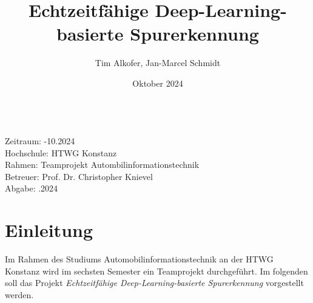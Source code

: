 \documentclass{article}
\title{Echtzeitfähige Deep-Learning-basierte Spurerkennung}
\author{Tim Alkofer, Jan-Marcel Schmidt}
\date{Oktober 2024} %
\begin{document}
    
    \maketitle
    
    \begin{tabbing}
    \hspace{5em} \= \\
        Zeitraum: -10.2024 \\ %
        Hochschule: \> HTWG Konstanz \\
        Rahmen: \> Teamprojekt Autombilinformationstechnik \\
        Betreuer: \> Prof. Dr. Christopher Knievel \\
        Abgabe: .2024 \\ %
    \end{tabbing}

    \clearpage
    \tableofcontents
    \clearpage
    \listoffigures
    \clearpage
    
    
    \clearpage

    \section{Einleitung}
        Im Rahmen des Studiums Automobilinformationstechnik an der HTWG Konstanz wird im sechsten Semester ein Teamprojekt durchgeführt.
        Im folgenden soll das Projekt \textit{Echtzeitfähige Deep-Learning-basierte Spurerkennung} vorgestellt werden.
\end{document}
